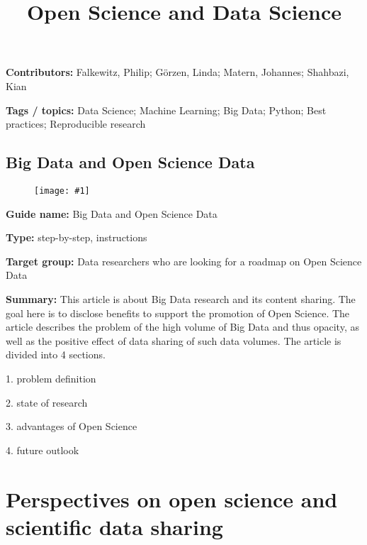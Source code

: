 \documentclass{article}
\newlength{\imgwidth}
\newcommand\scaledgraphics[2]{%
                
\settowidth{\imgwidth}{\texttt{[image: \#1]}}%
                
\setlength{\imgwidth}{\minof{\imgwidth}{#2\textwidth}}%
                
\texttt{[image: \#1]}%
                
}
\begin{document}
\title{Open Science and Data Science}

\maketitle


\textbf{Contributors:} Falkewitz, Philip;  Görzen, Linda; Matern, Johannes;  Shahbazi, Kian 


\textbf{Tags / topics:} Data Science; Machine Learning; Big Data; Python; Best practices; Reproducible research


\subsection{Big Data and Open Science Data}\label{H6205473}



\begin{center}
\begin{figure}
\scaledgraphics{25f071a6-9aec-4c08-bfd3-bfb548adfaee.jpg}{0.5}
\label{F77040021}
\end{figure}


\end{center}


 


\textbf{Guide name:} Big Data and Open Science Data \autocite{gutierrez_big_2015}


\textbf{Type:} step-by-step, instructions


\textbf{Target group:} Data researchers who are looking for a roadmap on Open Science Data


\textbf{Summary:} This article is about Big Data research and its content sharing. The goal here is to disclose benefits to support the promotion of Open Science. The article describes the problem of the high volume of Big Data and thus opacity, as well as the positive effect of data sharing of such data volumes. The article is divided into 4 sections.


1. problem definition


2. state of research


3. advantages of Open Science


4. future outlook


\section{Perspectives on open science and scientific data sharing}\label{H5120034}
\end{document}

